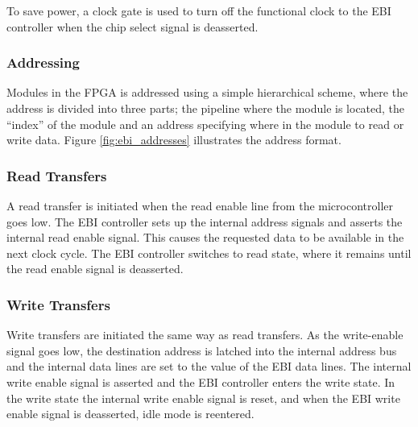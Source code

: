 To save power, a clock gate is used to turn off the functional clock to
the EBI controller when the chip select signal is deasserted.



\subsubsection{Addressing}

Modules in the FPGA is addressed using a simple hierarchical scheme, where the
address is divided into three parts; the pipeline where the module is located,
the ``index'' of the module and an address specifying where in the module to
read or write data. Figure \ref{fig:ebi_addresses} illustrates the address
format.



\FloatBarrier
\subsubsection{Read Transfers}

A read transfer is initiated when the read enable line from the microcontroller 
goes low. The EBI controller sets up the internal address signals and asserts 
the internal read enable signal. This causes the requested data to be available 
in the next clock cycle. The EBI controller switches to read state, where it 
remains until the read enable signal is deasserted.

\subsubsection{Write Transfers}

Write transfers are initiated the same way as read transfers. As the 
write-enable signal goes low, the destination address is latched into the 
internal address bus and the internal data lines are set to the value of the 
EBI data lines. The internal write enable signal is asserted and the EBI 
controller enters the write state. In the write state the internal write enable 
signal is reset, and when the EBI write enable signal is deasserted, idle mode 
is reentered.
